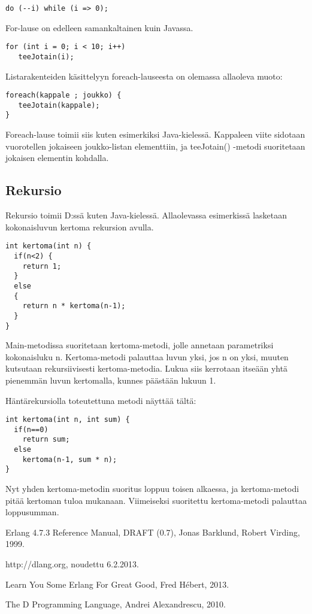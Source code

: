 \documentclass[11pt,oneside,a4paper]{article}
\begin{document}
\begin{verbatim}
do (--i) while (i => 0);
\end{verbatim}
For-lause on edelleen samankaltainen kuin Javassa.

\begin{verbatim}
for (int i = 0; i < 10; i++) 
   teeJotain(i);
\end{verbatim}
Listarakenteiden käsittelyyn foreach-lauseesta on olemassa allaoleva muoto:

\begin{verbatim}
foreach(kappale ; joukko) {
   teeJotain(kappale);
}
\end{verbatim}
Foreach-lause toimii siis kuten esimerkiksi Java-kielessä. Kappaleen viite
sidotaan vuorotellen jokaiseen joukko-listan elementtiin, ja teeJotain() -metodi
suoritetaan jokaisen elementin kohdalla. 

\subsection{Rekursio}

Rekursio toimii D:ssä kuten Java-kielessä. Allaolevassa esimerkissä lasketaan
kokonaisluvun kertoma rekursion avulla.

\begin{verbatim}
int kertoma(int n) {
  if(n<2) {
    return 1;
  }
  else
  {
    return n * kertoma(n-1);
  }
}
\end{verbatim}
Main-metodissa suoritetaan kertoma-metodi, jolle annetaan parametriksi
kokonaisluku n. Kertoma-metodi palauttaa luvun yksi, jos n on yksi, muuten
kutsutaan rekursiivisesti kertoma-metodia. Lukua siis kerrotaan itseään yhtä
pienemmän luvun kertomalla, kunnes päästään lukuun 1.  

Häntärekursiolla toteutettuna metodi näyttää tältä:
\begin{verbatim}
int kertoma(int n, int sum) {
  if(n==0) 
    return sum;
  else
    kertoma(n-1, sum * n);
}
\end{verbatim}
Nyt yhden kertoma-metodin suoritus loppuu toisen alkaessa, ja kertoma-metodi pitää kertoman tuloa mukanaan. Viimeiseksi suoritettu kertoma-metodi palauttaa loppusumman.


% 
% 



\begin{thebibliography}{99}

 Erlang 4.7.3 Reference Manual, DRAFT (0.7), Jonas Barklund, Robert Virding, 1999. 

 http://dlang.org, noudettu 6.2.2013.

 Learn You Some Erlang For Great Good, Fred Hébert, 2013.

 The D Programming Language, Andrei Alexandrescu, 2010.


\end{thebibliography}
\end{document}
